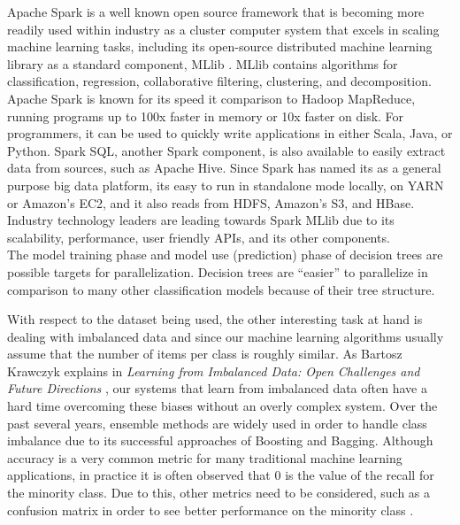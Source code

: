 \documentclass{neu_handout}
\begin{document}
Apache Spark is a well known open source framework that is becoming more readily used within industry as a cluster computer system that excels in scaling machine learning tasks, including its open-source distributed machine learning library as a standard component, MLlib \cite{mllib}. MLlib contains algorithms for classification, regression, collaborative filtering, clustering, and decomposition. Apache Spark is known for its speed it comparison to Hadoop MapReduce, running programs up to 100x faster in memory or 10x faster on disk. For programmers, it can be used to quickly write applications in either Scala, Java, or Python. Spark SQL, another Spark component, is also available to easily extract data from sources, such as Apache Hive. Since Spark has named its as a general purpose big data platform, its easy to run in standalone mode locally, on YARN or Amazon's EC2, and it also reads from HDFS, Amazon's S3, and HBase. Industry technology leaders are leading towards Spark MLlib due to its scalability, performance, user friendly APIs, and its other components.\\

The model training phase and model use (prediction) phase of decision trees are possible targets for parallelization. Decision trees are ``easier'' to parallelize in comparison to many other classification models because of their tree structure.

With respect to the dataset being used, the other interesting task at hand is dealing with imbalanced data and since our machine learning algorithms usually assume that the number of items per class is roughly similar. As Bartosz Krawczyk explains in \textit{Learning from Imbalanced Data: Open Challenges and Future Directions} \cite{Krawczyk}, our systems that learn from imbalanced data often have a hard time overcoming these biases without an overly complex system. Over the past several years, ensemble methods are widely used in order to handle class imbalance due to its successful approaches of Boosting and Bagging. Although accuracy is a very common metric for many traditional machine learning applications, in practice it is often observed that 0 is the value of the recall for the minority class. Due to this, other metrics need to be considered, such as a confusion matrix in order to see better performance on the minority class \cite{imbalance}.
\end{document}
